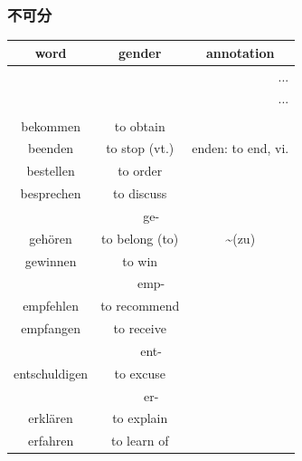\subsubsection{不可分}
\begin{center}
    \begin{longtable} {|c|c|c|}
        \hline
        \rowcolor{gray}
        word           & gender           & annotation           \\
        \hline
        \endfirsthead
        \multicolumn{3}{r}{...}                                  \\
        \hline
        \endhead
        \hline
        \multicolumn{3}{r}{...}                                  \\
        \endfoot
        \hline
        \endlastfoot
        \hline
        \multicolumn{3}{|c|}{be-}                                \\
        \hline
        bekommen       & to obtain        &                      \\
        beenden        & to stop (vt.)    & enden: to end, vi.   \\
        bestellen      & to order         &                      \\
        besprechen     & to discuss       &                      \\
        \hline
        \multicolumn{3}{|c|}{ge-}                                \\
        \hline
        gehören        & to belong (to)   & \textasciitilde (zu) \\
        gewinnen       & to win           &                      \\
        \hline
        \multicolumn{3}{|c|}{emp-}                               \\
        \hline
        empfehlen      & to recommend     &                      \\
        empfangen      & to receive       &                      \\
        \hline
        \multicolumn{3}{|c|}{ent-}                               \\
        \hline
        entschuldigen  & to excuse        &                      \\
        \hline
        \multicolumn{3}{|c|}{er-}                                \\
        \hline
        erklären       & to explain       &                      \\
        erfahren       & to learn of      &                      \\

\end{longtable}
\end{center}

